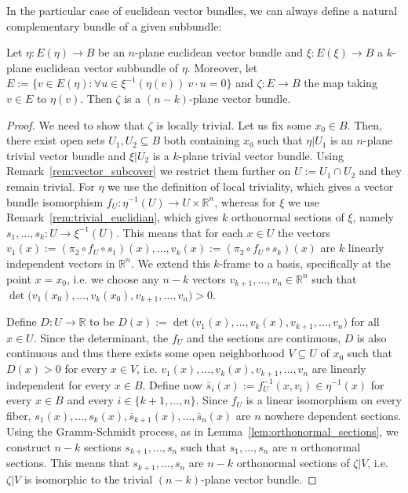 In the particular case of euclidean vector bundles, we can always define a natural complementary bundle of a given subbundle:
\begin{proposition} Let $\eta:E(\eta)\to B$ be an $n$-plane euclidean vector bundle and $\xi:E(\xi)\to B$ a $k$-plane euclidean vector subbundle of $\eta$. Moreover, let $E:=\{v\in E(\eta):\forall u\in\xi^{-1}(\eta(v))\ v\cdot u=0\}$ and $\zeta:E\to B$ the map taking $v\in E$ to $\eta(v)$. Then $\zeta$ is a $(n-k)$-plane vector bundle.
\end{proposition}
\begin{proof} We need to show that $\zeta$ is locally trivial. Let us fix some $x_0\in B$. Then, there exist open sets $U_1,U_2\subseteq B$ both containing $x_0$ such that $\eta|U_1$ is an $n$-plane trivial vector bundle and $\xi|U_2$ is a $k$-plane trivial vector bundle. Using Remark~\ref{rem:vector_subcover} we restrict them further on $U:=U_1\cap U_2$ and they remain trivial. For $\eta$ we use the definition of local triviality, which gives a vector bundle isomorphism $f_U:\eta^{-1}(U)\to U\times\mathbb{R}^n$, whereas for $\xi$ we use Remark~\ref{rem:trivial_euclidian}, which gives $k$ orthonormal sections of $\xi$, namely $s_1,\ldots,s_k:U\to\xi^{-1}(U)$. This means that for each $x\in U$ the vectors $v_1(x):=(\pi_2\circ f_U\circ s_1)(x),\ldots,v_k(x):=(\pi_2\circ f_U\circ s_k)(x)$ are $k$ linearly independent vectors in $\mathbb{R}^n$. We extend this $k$-frame to a basis, specifically at the point $x=x_0$, i.e. we choose any $n-k$ vectors $v_{k+1},\ldots,v_n\in\mathbb{R}^n$ such that
$\det\big(v_1(x_0),\ldots,v_k(x_0),v_{k+1},\ldots,v_n\big)>0$.

Define $D:U\to\mathbb{R}$ to be $D(x):=\det\big(v_1(x),\ldots,v_k(x),v_{k+1},\ldots,v_n\big)$ for all $x\in U$. Since the determinant, the $f_U$ and the sections are continuous, $D$ is also continuous and thus there exists some open neighborhood $V\subseteq U$ of $x_0$ such that $D(x)>0$ for every $x\in V$, i.e. $v_1(x),\ldots,v_k(x),v_{k+1},\ldots,v_n$ are linearly independent for every $x\in B$. Define now $\bar{s}_i(x):=f_U^{-1}(x,v_i)\in\eta^{-1}(x)$ for every $x\in B$ and every $i\in\{k+1,\ldots,n\}$. Since $f_U$ is a linear isomorphism on every fiber, $s_1(x),\ldots,s_k(x),\bar{s}_{k+1}(x),\ldots,\bar{s}_n(x)$ are $n$ nowhere dependent sections. Using the Gramm-Schmidt process, as in Lemma~\ref{lem:orthonormal_sections}, we construct $n-k$ sections $s_{k+1},\ldots,s_n$ such that $s_1,\ldots,s_n$ are $n$ orthonormal sections. This means that $s_{k+1},\ldots,s_n$ are $n-k$ orthonormal sections of $\zeta|V$, i.e. $\zeta|V$ is isomorphic to the trivial $(n-k)$-plane vector bundle.
\end{proof}

